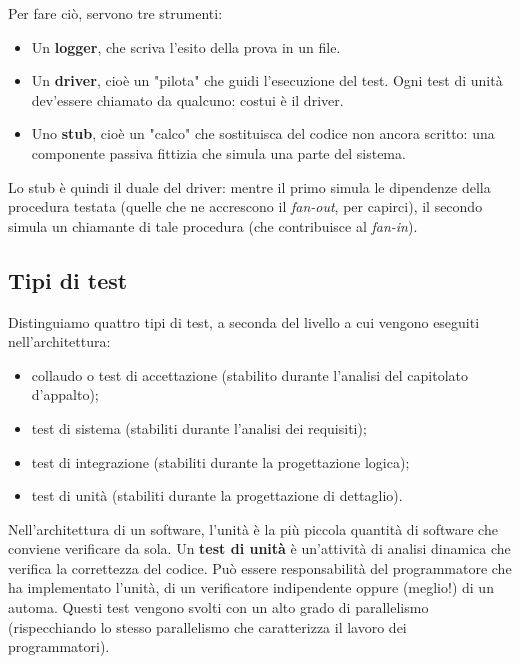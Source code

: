 \documentclass[a4paper]{article}
\begin{document}
		
Per fare ciò, servono tre strumenti:
		
	\begin{itemize}
		
			
	\item Un \textbf{logger}, che scriva l'esito della prova in un file.
			
	\item Un \textbf{driver}, cioè un "pilota" che guidi l'esecuzione del test. Ogni test di unità dev'essere chiamato da qualcuno: costui è il driver.
			
	\item Uno \textbf{stub}, cioè un "calco" che sostituisca del codice non ancora scritto: una componente passiva fittizia che simula una parte del sistema.
		
	\end{itemize}

		
Lo stub è quindi il duale del driver: mentre il primo simula le dipendenze della procedura testata (quelle che ne accrescono il \emph{fan-out}, per capirci), il secondo simula un chiamante di tale procedura (che contribuisce al \emph{fan-in}).

		
	\subsection{Tipi di test}

		
Distinguiamo quattro tipi di test, a seconda del livello a cui vengono eseguiti nell'architettura:
		
	\begin{itemize}
		
			
	\item collaudo o test di accettazione (stabilito durante l'analisi del capitolato d'appalto);
			
	\item test di sistema (stabiliti durante l'analisi dei requisiti);
			
	\item test di integrazione (stabiliti durante la progettazione logica);
			
	\item test di unità (stabiliti durante la progettazione di dettaglio).
		
	\end{itemize}

		
Nell'architettura di un software, l'unità è la più piccola quantità di software che conviene verificare da sola. Un \textbf{test di unità} è un'attività di analisi dinamica che verifica la correttezza del codice. Può essere responsabilità del programmatore che ha implementato l'unità, di un verificatore indipendente oppure (meglio!) di un automa. Questi test vengono svolti con un alto grado di parallelismo (rispecchiando lo stesso parallelismo che caratterizza il lavoro dei programmatori).
		
\end{document}
